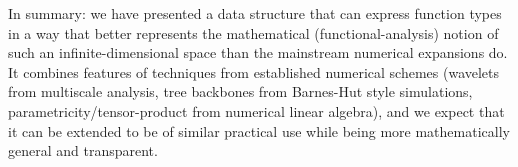 \documentclass[sigplan,screen]{acmart}
\theoremstyle{acmplain}
\theoremstyle{acmdefinition}
\begin{document}
In summary: we have presented a data structure that can express function types in a way that better represents the mathematical (functional-analysis) notion of such an infinite-dimensional space than the mainstream numerical expansions do.
It combines features of techniques from established numerical schemes (wavelets from multiscale analysis, tree backbones from Barnes-Hut style simulations, pa\-ra\-met\-ri\-ci\-ty/ten\-sor-pro\-duct from numerical linear algebra), and we expect that it can be extended to be of similar practical use while being more mathematically general and transparent.


%
\end{document}

